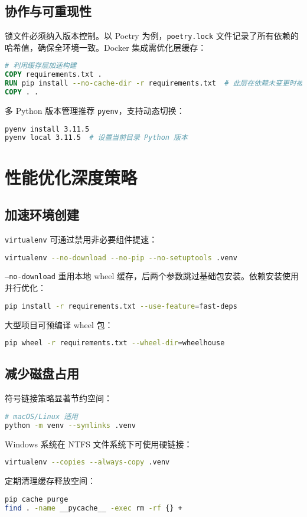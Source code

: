 \section{协作与可重现性}
锁文件必须纳入版本控制。以 Poetry 为例，\texttt{poetry.lock} 文件记录了所有依赖的哈希值，确保全环境一致。Docker 集成需优化层缓存：\par
\begin{lstlisting}[language=dockerfile]
# 利用缓存层加速构建
COPY requirements.txt .
RUN pip install --no-cache-dir -r requirements.txt  # 此层在依赖未变更时被复用
COPY . .
\end{lstlisting}
多 Python 版本管理推荐 \texttt{pyenv}，支持动态切换：\par
\begin{lstlisting}[language=bash]
pyenv install 3.11.5
pyenv local 3.11.5  # 设置当前目录 Python 版本
\end{lstlisting}
\chapter{性能优化深度策略}
\section{加速环境创建}
\texttt{virtualenv} 可通过禁用非必要组件提速：\par
\begin{lstlisting}[language=bash]
virtualenv --no-download --no-pip --no-setuptools .venv
\end{lstlisting}
\texttt{--no-download} 重用本地 wheel 缓存，后两个参数跳过基础包安装。依赖安装使用并行优化：\par
\begin{lstlisting}[language=bash]
pip install -r requirements.txt --use-feature=fast-deps
\end{lstlisting}
大型项目可预编译 wheel 包：\par
\begin{lstlisting}[language=bash]
pip wheel -r requirements.txt --wheel-dir=wheelhouse
\end{lstlisting}
\section{减少磁盘占用}
符号链接策略显著节约空间：\par
\begin{lstlisting}[language=bash]
# macOS/Linux 适用
python -m venv --symlinks .venv
\end{lstlisting}
Windows 系统在 NTFS 文件系统下可使用硬链接：\par
\begin{lstlisting}[language=bash]
virtualenv --copies --always-copy .venv
\end{lstlisting}
定期清理缓存释放空间：\par
\begin{lstlisting}[language=bash]
pip cache purge
find . -name __pycache__ -exec rm -rf {} +
\end{lstlisting}
